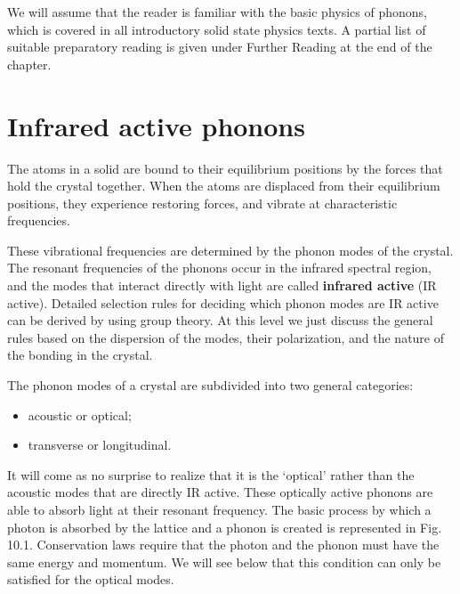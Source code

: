 \documentclass[12pt]{book}
\begin{document}
{\begin{shaded}
We will assume that the reader is familiar with the basic physics of phonons, which is covered in all introductory solid state physics texts. A partial list of suitable preparatory reading is given under Further Reading at the end of the chapter.
\end{shaded}

\section{Infrared active phonons}

The atoms in a solid are bound to their equilibrium positions by the forces that hold the crystal together. When the atoms are displaced from their equilibrium positions, they experience restoring forces, and vibrate at characteristic frequencies.

These vibrational frequencies are determined by the phonon modes of the crystal. The resonant frequencies of the phonons occur in the infrared spectral region, and the modes that interact directly with light are called \textbf{infrared active} (IR active). Detailed selection rules for deciding which phonon modes are IR active can be derived by using group theory. At this level we just discuss the general rules based on the dispersion of the modes, their polarization, and the nature of the bonding in the crystal.

The phonon modes of a crystal are subdivided into two general categories:
\begin{itemize}
  \item acoustic or optical;
  \item transverse or longitudinal.
\end{itemize}
It will come as no surprise to realize that it is the `optical' rather than the acoustic modes that are directly IR active. These optically active phonons are able to absorb light at their resonant frequency. The basic process by which a photon is absorbed by the lattice and a phonon is created is represented in Fig. 10.1. Conservation laws require that the photon and the phonon must have the same energy and momentum. We will see below that this condition can only be satisfied for the optical modes.

}
\end{document}
